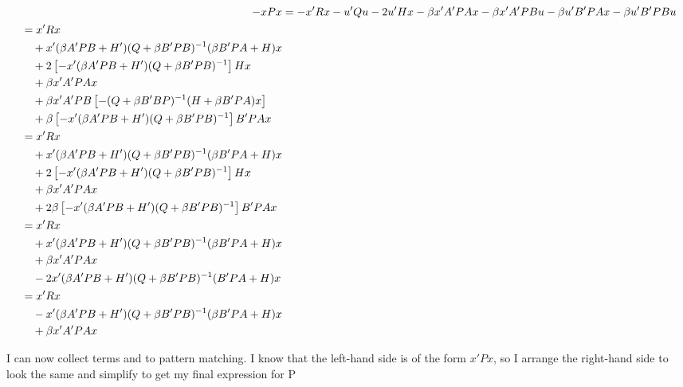 \begin{homeworkProblem}[Problem 5.1]
{\begin{enumerate}[a.]
        \begin{align*}
          -x P x &= -x'Rx - u'Qu - 2u'Hx - \beta x'A'PAx - \beta x'A'PBu - \beta u'B'PAx - \beta u'B'PBu \\
          \begin{split}
            &= x'Rx \\
            &\quad + x'(\beta A'PB + H')(Q + \beta B'PB)^{-1}(\beta B'PA + H) x \\
            &\quad + 2\left[ - x'(\beta A'PB + H')(Q + \beta B'PB)^{-1} \right] Hx \\
            & \quad + \beta x'A'PAx \\
            & \quad + \beta x'A'PB\left[ - (Q + \beta B'BP)^{-1} (H + \beta B'PA)x \right] \\
            & \quad + \beta \left[ - x'(\beta A'PB + H')(Q + \beta B'PB)^{-1} \right] B'PAx
          \end{split}\\
          \begin{split}
            &= x'Rx \\
            &\quad + x'(\beta A'PB + H')(Q + \beta B'PB)^{-1}(\beta B'PA + H) x \\
            &\quad + 2\left[ - x'(\beta A'PB + H')(Q + \beta B'PB)^{-1} \right] Hx \\
            & \quad + \beta x'A'PAx \\
            & \quad + 2\beta \left[ - x'(\beta A'PB + H')(Q + \beta B'PB)^{-1} \right] B'PAx
          \end{split}\\
          \begin{split}
            &= x'Rx \\
            &\quad + x'(\beta A'PB + H')(Q + \beta B'PB)^{-1}(\beta B'PA + H) x \\
            & \quad + \beta x'A'PAx \\
            & \quad -2x'(\beta A'PB + H')(Q+ \beta B'PB)^{-1} (B'PA + H)x
          \end{split}\\
          \begin{split}
            &= x'Rx \\
            &\quad - x'(\beta A'PB + H')(Q + \beta B'PB)^{-1}(\beta B'PA + H) x \\
            & \quad + \beta x'A'PAx \\
          \end{split}
        \end{align*}

        I can now collect terms and to pattern matching. I know that the left-hand side is of the form $x'Px$, so I arrange the right-hand side to look the same and simplify to get my final expression for P


\end{enumerate}}
\end{homeworkProblem}
